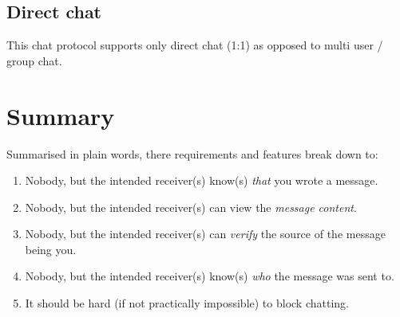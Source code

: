 \subsection{Direct chat}
This chat protocol supports only direct chat (1:1) as opposed 
to multi user / group chat.
\section{Summary}
Summarised in plain words, there requirements and features break down to:
\begin{enumerate}
\item Nobody, but the intended receiver(s) know(s) \emph{that} you wrote a message.
\item Nobody, but the intended receiver(s) can view the \emph{message content}.
\item Nobody, but the intended receiver(s) can \emph{verify} the source of the message being you.
\item Nobody, but the intended receiver(s) know(s) \emph{who} the message was sent to.
\item It should be hard (if not practically impossible) to block chatting.
\end{enumerate}
